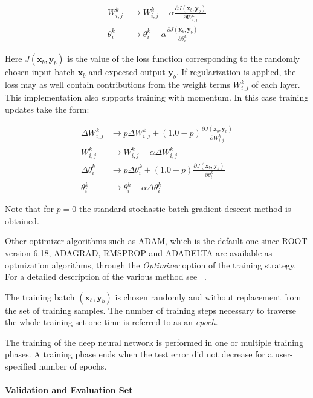 \begin{align}
  W^k_{i,j}   & \rightarrow W^k_{i,j}   - \alpha \frac{\partial J(\mathbf{x}_b, \mathbf{y}_b)}{\partial W^k_{i,j}} \\
  \theta^k_i & \rightarrow \theta^k_i - \alpha \frac{\partial J(\mathbf{x}_b, \mathbf{y}_b)}{\partial \theta^k_{i}}
\end{align}

Here $J(\mathbf{x}_b,\mathbf{y}_b)$ is the value of the loss function corresponding to
the randomly chosen input batch $\mathbf{x}_b$ and expected output
$\mathbf{y}_b$. If regularization is applied, the loss may as well contain
contributions from the weight terms $W^k_{i,j}$ of each layer. This implementation also supports training with momentum. In this case training updates take the form:

\begin{align}
  \Delta W^k_{i,j}   & \rightarrow p \Delta W^k_{i,j}   + (1.0 - p) \frac{\partial J(\mathbf{x}_b, \mathbf{y}_b)}{\partial W^k_{i,j}} \\
  W^k_{i,j}   & \rightarrow W^k_{i,j}   - \alpha \Delta W^k_{i,j} \\
  \Delta \theta^k_i & \rightarrow p \Delta \theta^k_i + (1.0 - p) \frac{\partial J(\mathbf{x}_b, \mathbf{y}_b)}{\partial \theta^k_{i}} \\
  \theta^k_i & \rightarrow \theta^k_i - \alpha \Delta \theta^k_i
\end{align}

Note that for $p = 0$ the standard stochastic batch gradient descent method is
obtained.

Other optimizer algorithms such as ADAM, which is the default one since ROOT version 6.18, ADAGRAD, RMSPROP and ADADELTA
are available as optmization algorithms, through the {\it Optimizer} option of the training strategy.
For a detailed description of the various method see ~\cite{dl_optimizers}.

The training batch $(\mathbf{x}_b,\mathbf{y}_b)$ is chosen randomly
and without replacement from the set of training samples. The number
of training steps necessary to traverse the whole training set one time is
referred to as an \textit{epoch}.

The training of the deep neural network is performed in one or
multiple training phases. A training phase ends when the test error
did not decrease for a user-specified number of epochs.

\paragraph{Validation and Evaluation Set}
\label{sec:dnn_test_and_evaluation_set}

